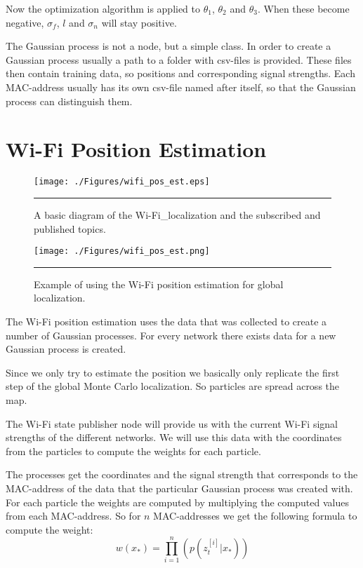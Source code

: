 Now the optimization algorithm is applied to $\theta_1$, $\theta_2$ and $\theta_3$. When these become negative, $\sigma_f$, $l$ and $\sigma_n$ will stay positive. 

The Gaussian process is not a node, but a simple class. In order to create a Gaussian process usually a path to a folder with csv-files is provided. These files then contain training data, so positions and corresponding signal strengths. Each MAC-address usually has its own csv-file named after itself, so that the Gaussian process can distinguish them. 

\section{Wi-Fi Position Estimation}
\begin{figure}[htbp]
	\centering
		\texttt{[image: ./Figures/wifi\_pos\_est.eps]}
		\rule{35em}{0.5pt}
	\caption[Diagram of the Wi-Fi\_localization]{A basic diagram of the Wi-Fi\_localization and the subscribed and published topics.}
	\label{fig:ros_localization}
\end{figure}
\begin{figure}[htbp]
	\centering
		\texttt{[image: ./Figures/wifi\_pos\_est.png]}
		\rule{35em}{0.5pt}
	\caption[Wi-Fi position estimation example]{Example of using the Wi-Fi position estimation for global localization.}
	\label{fig:wifi_pos_est_example}
\end{figure}
The Wi-Fi position estimation uses the data that was collected to create a number of Gaussian processes. For every network there exists data for a new Gaussian process is created. 

Since we only try to estimate the position we basically only replicate the first step of the global Monte Carlo localization. So particles are spread across the map. 

The Wi-Fi state publisher node will provide us with the current Wi-Fi signal strengths of the different networks. We will use this data with the coordinates from the particles to compute the weights for each particle. 

The processes get the coordinates and the signal strength that corresponds to the MAC-address of the data that the particular Gaussian process was created with. For each particle the weights are computed by multiplying the computed values from each MAC-address. So for $n$ MAC-addresses we get the following formula to compute the weight:
\begin{equation}
w(x_*) = \prod_{i=1}^n(p(z_{t}^{[i]}|x_*))
\end{equation} 

